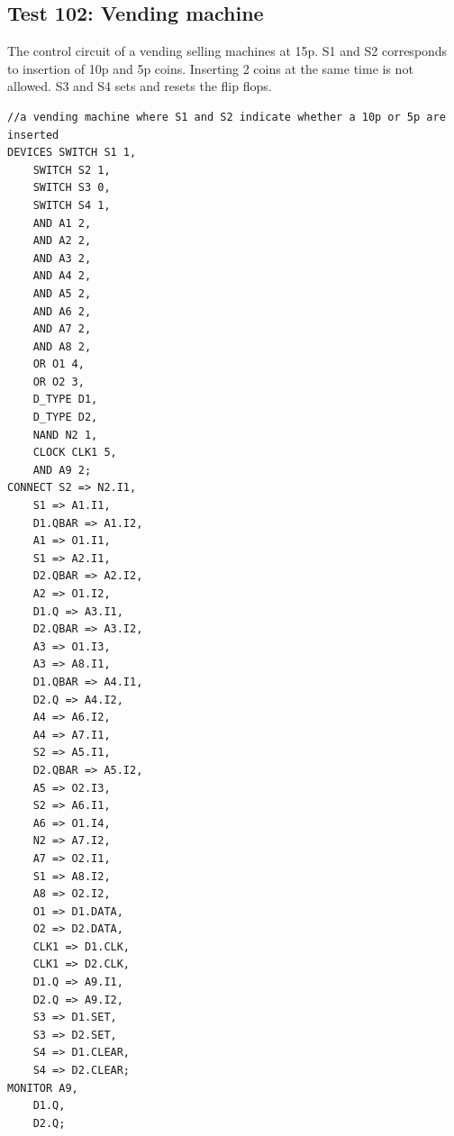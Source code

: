 \documentclass[12pt]{article}
\begin{document}
\subsection{Test 102: Vending machine}
The control circuit of a vending selling machines at 15p. S1 and S2 corresponds to insertion of 10p and 5p coins. Inserting 2 coins at the same time is not allowed. S3 and S4 sets and resets the flip flops.\\
\begin{verbatim}
//a vending machine where S1 and S2 indicate whether a 10p or 5p are inserted
DEVICES	SWITCH S1 1, 
	SWITCH S2 1,
	SWITCH S3 0,
	SWITCH S4 1,
	AND A1 2,
	AND A2 2,
	AND A3 2,
	AND A4 2,
	AND A5 2,
	AND A6 2,
	AND A7 2,
	AND A8 2,
	OR O1 4,
	OR O2 3,
	D_TYPE D1,
	D_TYPE D2,
	NAND N2 1,
	CLOCK CLK1 5,
	AND A9 2;
CONNECT	S2 => N2.I1,
	S1 => A1.I1,
	D1.QBAR => A1.I2,
	A1 => O1.I1,
	S1 => A2.I1,
	D2.QBAR => A2.I2,
	A2 => O1.I2,
	D1.Q => A3.I1,
	D2.QBAR => A3.I2,
	A3 => O1.I3,
	A3 => A8.I1,
	D1.QBAR => A4.I1,
	D2.Q => A4.I2,
	A4 => A6.I2,
	A4 => A7.I1,
	S2 => A5.I1,
	D2.QBAR => A5.I2,
	A5 => O2.I3,
	S2 => A6.I1,
	A6 => O1.I4,
	N2 => A7.I2,
	A7 => O2.I1,
	S1 => A8.I2,
	A8 => O2.I2,
	O1 => D1.DATA,
	O2 => D2.DATA,
	CLK1 => D1.CLK,
	CLK1 => D2.CLK,
	D1.Q => A9.I1,
	D2.Q => A9.I2,
	S3 => D1.SET,
	S3 => D2.SET,
	S4 => D1.CLEAR,
	S4 => D2.CLEAR;
MONITOR	A9,
	D1.Q,
	D2.Q;
\end{verbatim}
\end{document}
